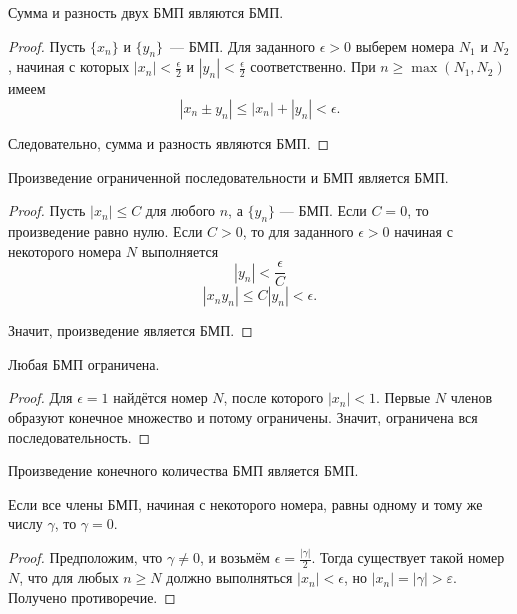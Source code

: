 \vspace{3mm}

\begin{theorem} \label{theorem_BMP_sumdiff}
Сумма и разность двух БМП являются БМП.

\begin{proof}
Пусть \(\{x_{n}\}\) и \(\{y_{n}\}\)~--- БМП. Для заданного
\(\epsilon > 0\) выберем номера \(N_{1}\) и \(N_{2}\), начиная с
которых \(|x_{n}| < \frac{\epsilon}{2}\) и
\(|y_{n}| < \frac{\epsilon}{2}\) соответственно. При
\(n \geq \max(N_{1},N_{2})\) имеем
\[
|x_{n} \pm y_{n}| \leq |x_{n}| + |y_{n}| < \epsilon.
\]

Следовательно, сумма и разность являются БМП.
\end{proof}
\end{theorem}

\begin{theorem} \label{theorem_BMP_product}
Произведение ограниченной последовательности и БМП является БМП.

\begin{proof}
Пусть \(|x_{n}| \leq C\) для любого \(n\), а
\(\{y_{n}\}\) --- БМП. Если \(C = 0\), то произведение равно нулю.
Если \(C > 0\), то для заданного \(\epsilon > 0\) начиная с некоторого
номера \(N\) выполняется
\[
|y_{n}| < \frac{\epsilon}{C}
\]
\[
|x_{n}y_{n}| \leq C|y_{n}| < \epsilon.
\]

    Значит, произведение является БМП.
\end{proof}
\end{theorem}

\begin{theorem}
Любая БМП ограничена.

\begin{proof}
Для \(\epsilon = 1\) найдётся номер \(N\), после которого
\(|x_{n}| < 1\). Первые \(N\) членов образуют конечное множество и
потому ограничены. Значит, ограничена вся последовательность.
\end{proof}
\end{theorem}

\begin{corollary}
Произведение конечного количества БМП является БМП.
\end{corollary}

\begin{theorem}
Если все члены БМП, начиная с некоторого номера, равны одному и тому же
числу \(\gamma\), то \(\gamma = 0\).

\begin{proof}
Предположим, что \(\gamma \neq 0\), и возьмём
\(\epsilon = \frac{|\gamma|}{2}\). Тогда существует такой номер \(N\),
что для любых \(n \geq N\) должно выполняться \(|x_{n}| < \epsilon\), но
\(|x_{n}|=|\gamma|>\varepsilon\). Получено противоречие.
\end{proof}
\end{theorem}

